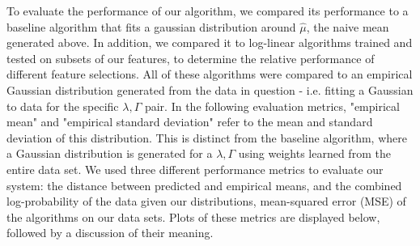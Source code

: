 \documentclass[12pt,letterpaper]{article}
\begin{document}
To evaluate the performance of our algorithm, we compared its performance to a baseline algorithm that fits a gaussian distribution around $\hat{\mu}$, the naive mean generated above. In addition, we compared it to log-linear algorithms trained and tested on subsets of our features, to determine the relative performance of different feature selections. All of these algorithms were compared to an empirical Gaussian distribution generated from the data in question - i.e. fitting a Gaussian to data for the specific $\lambda, \Gamma$ pair. In the following evaluation metrics, "empirical mean" and "empirical standard deviation" refer to the mean and standard deviation of this distribution. This is distinct from the baseline algorithm, where a Gaussian distribution is generated for a $\lambda, \Gamma$ using weights learned from the entire data set. We used three different performance metrics to evaluate our system: the distance between predicted and empirical means, and the combined log-probability of the data given our distributions, mean-squared error (MSE) of the algorithms on our data sets. Plots of these metrics are displayed below, followed by a discussion of their meaning. 
\end{document}
